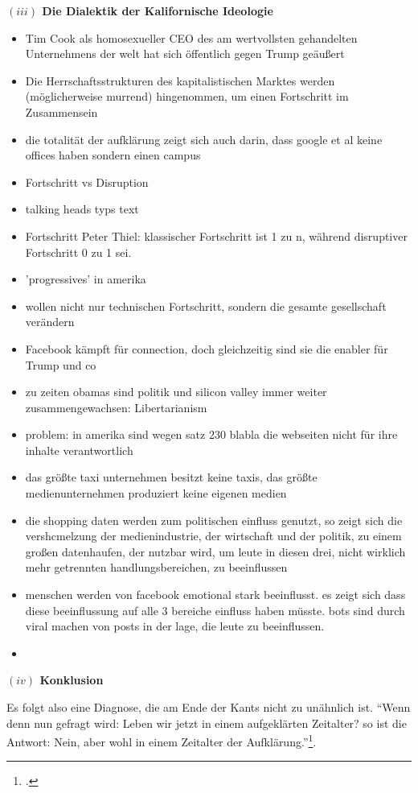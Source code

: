 \documentclass[a4paper, 12pt]{article}
\begin{document}
\begin{onehalfspace}
\vspace{5mm}
\noindent\textbf{$(iii)$ Die Dialektik der Kalifornische Ideologie}

\noindent 

\begin{itemize}
  \item Tim Cook als homosexueller CEO des am wertvollsten gehandelten Unternehmens der welt hat sich öffentlich gegen Trump geäußert
  \item Die Herrschaftsstrukturen des kapitalistischen Marktes werden (möglicherweise murrend) hingenommen, um einen Fortschritt im Zusammensein 
  \item die totalität der aufklärung zeigt sich auch darin, dass google et al keine offices haben sondern einen campus
  \item Fortschritt vs Disruption
  \item talking heads typs text
  \item Fortschritt Peter Thiel: klassischer Fortschritt ist 1 zu n, während disruptiver Fortschritt 0 zu 1 sei.
  \item 'progressives' in amerika
  \item wollen nicht nur technischen Fortschritt, sondern die gesamte gesellschaft verändern
  \item Facebook kämpft für connection, doch gleichzeitig sind sie die enabler für Trump und co
  \item zu zeiten obamas sind politik und silicon valley immer weiter zusammengewachsen: Libertarianism 
  \item problem: in amerika sind wegen satz 230 blabla die webseiten nicht für ihre inhalte verantwortlich
  \item das größte taxi unternehmen besitzt keine taxis, das größte medienunternehmen produziert keine eigenen medien
  \item die shopping daten werden zum politischen einfluss genutzt, so zeigt sich die vershcmelzung der medienindustrie, der wirtschaft und der politik, zu einem großen datenhaufen, der nutzbar wird, um leute in diesen drei, nicht wirklich mehr getrennten handlungsbereichen, zu beeinflussen
  \item menschen werden von facebook emotional stark beeinflusst. es zeigt sich dass diese beeinflussung auf alle 3 bereiche einfluss haben müsste. bots sind durch viral machen von posts in der lage, die leute zu beeinflussen. 
  \item 
\end{itemize}


\vspace{5mm}
\noindent\textbf{$(iv)$ Konklusion}

\noindent Es folgt also eine Diagnose, die am Ende der Kants nicht zu unähnlich ist. "`Wenn denn nun gefragt wird: Leben wir jetzt in einem aufgeklärten Zeitalter? so ist die Antwort: Nein, aber wohl in einem Zeitalter der Aufklärung."'\footnote{\Cite[Siehe][S. 491]{kant}.}.



\end{onehalfspace}
\nocite{*}
\printbibliography
\end{document}
